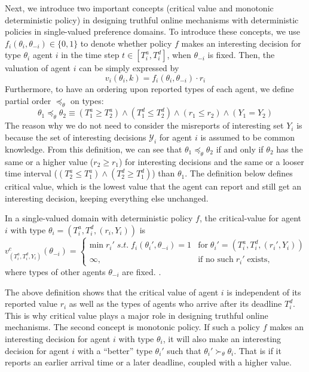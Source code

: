 \documentclass[11pt]{phdthesis}
\begin{document}
Next, we introduce two important concepts (critical value and monotonic deterministic policy) in designing truthful online mechanisms with deterministic policies in single-valued preference domains. To introduce these concepts, we use $f_i(\theta_i, \theta_{-i}) \in \{ 0, 1 \}$ to denote whether policy $f$ makes an interesting decision for type $\theta_i$ agent $i$ in the time step $t \in [T_i^a, T_i^d]$, when $\theta_{-i}$ is fixed. Then, the valuation of agent $ i $ can be simply expressed by 
\[v_i(\theta_i,k) = f_i(\theta_i, \theta_{-i})\cdot r_i \]
Furthermore, to have an ordering upon reported types of each agent, we define partial order $\preceq_{\theta} $ on types:
$$\theta_1 \preceq_{\theta} \theta_2 \equiv (T_1^a \geq T_2^a) \wedge (T_1^d \leq T_2^d) \wedge (r_1 \leq r_2) \wedge (Y_1 = Y_2) $$
The reason why we do not need to consider the misreports of interesting set $ Y_i $ is because the set of interesting decisions $\mathcal{Y}_i$ for agent $i$ is assumed to be common knowledge. From this definition, we can see that $ \theta_1 \preceq_{\theta} \theta_2 $ if and only if $  \theta_2  $ has the same or a higher value ($ r_2 \geq r_1 $) for interesting decisions and the same or a looser time interval ($ (T_2^a \leq T_1^a) \wedge (T_2^d \geq T_1^d) $) than $ \theta_1 $.  
The definition below defines critical value, which is the lowest value that the agent can report and still get an interesting decision, keeping everything else unchanged. 
\begin{definition}
	In a single-valued domain with deterministic policy $f$, the critical-value for agent $i$ with type $\theta_i = (T_i^a,T_i^d,(r_i,Y_i))$ is
	\[ v_{(T_i^a,T_i^d,Y_i)}^c(\theta_{-i}) =
	\begin{cases}
	\text{min} \; r_i' \; s.t. \; f_i(\theta_i',\theta_{-i}) = 1 & \text{for} \; \theta_i' = (T_i^a,T_i^d,(r_i',Y_i)) \\
	\infty, & \text{if no such} \; r_i' \; \text{exists},
	\end{cases}
	\]
	where types of other agents $\theta_{-i}$ are fixed. 
	\citep[Definition 16.10]{nisan2007algorithmic}.
\end{definition}

The above definition shows that the critical value of agent $ i $ is independent of its reported value $ r_i $ as well as the types of agents who arrive after its deadline $ T_i^d $. This is why critical value plays a major role in designing truthful online mechanisms. The second concept is monotonic policy. If such a policy $f$ makes an interesting decision for agent $i$ with type $\theta_i$, it will also make an interesting decision for agent $i$ with a ``better'' type $ \theta_i'  $ such that $\theta_i' \succ_{\theta} \theta_i$. That is if it reports an earlier arrival time or a later deadline, coupled with a higher value.
\end{document}
